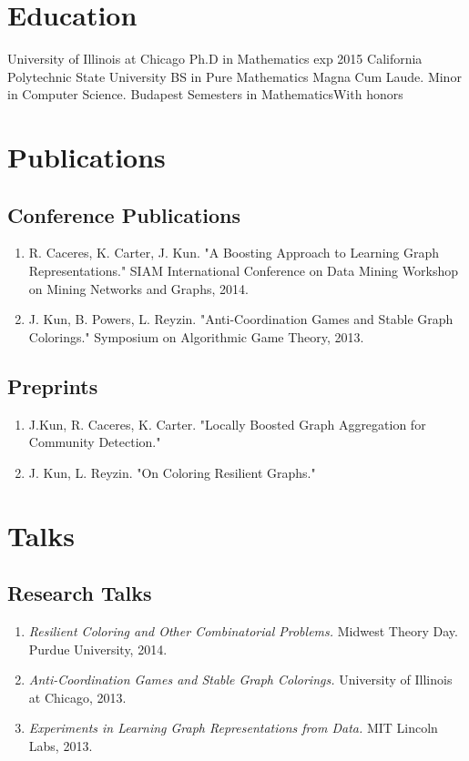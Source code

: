    \section{Education}
            {University of Illinois at Chicago}
            {}{Ph.D in Mathematics exp 2015}
            {}{}
            {California Polytechnic State University}
            {}{BS in Pure Mathematics}
            {}{Magna Cum Laude. Minor in Computer Science.}
            {Budapest Semesters in Mathematics}{}{}{}{With honors}

   \section{Publications}
      \subsection{Conference Publications}
         \begin{enumerate}
            \item R. Caceres, K. Carter, J. Kun. "A Boosting Approach to Learning Graph Representations." SIAM International Conference on Data Mining Workshop on Mining Networks and Graphs, 2014.
            \item J. Kun, B. Powers, L. Reyzin. "Anti-Coordination Games and Stable Graph Colorings." Symposium on Algorithmic Game Theory, 2013. 
         \end{enumerate}

      \subsection{Preprints}
         \begin{enumerate}
            \item J.Kun, R. Caceres, K. Carter. "Locally Boosted Graph Aggregation for Community Detection." 
            \item J. Kun, L. Reyzin. "On Coloring Resilient Graphs." 
         \end{enumerate}

   \section{Talks}
   \subsection{Research Talks}
      \begin{enumerate}
         \item {\em Resilient Coloring and Other Combinatorial Problems.} Midwest Theory Day. Purdue University, 2014.
         \item {\em Anti-Coordination Games and Stable Graph Colorings.} University of Illinois at Chicago, 2013.
         \item {\em Experiments in Learning Graph Representations from Data.} MIT Lincoln Labs, 2013.
      \end{enumerate}

